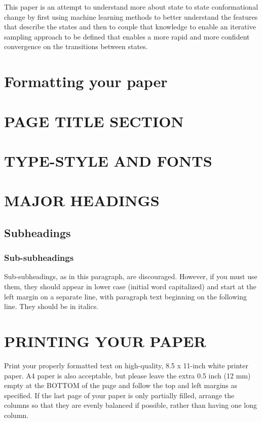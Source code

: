 \documentclass{article}
\begin{document}
This paper is an attempt to understand more about state to state conformational
change by first using machine learning methods to better understand the features
that describe the states and then to couple that knowledge to enable an iterative
sampling approach to be defined that enables a more rapid and more confident
convergence on the transitions between states.



\section{Formatting your paper}
\label{sec:format}


\section{PAGE TITLE SECTION}
\label{sec:pagestyle}


\section{TYPE-STYLE AND FONTS}
\label{sec:typestyle}


\section{MAJOR HEADINGS}
\label{sec:majhead}


\subsection{Subheadings}
\label{ssec:subhead}


\subsubsection{Sub-subheadings}
\label{sssec:subsubhead}

Sub-subheadings, as in this paragraph, are discouraged. However, if you
must use them, they should appear in lower case (initial word
capitalized) and start at the left margin on a separate line, with paragraph
text beginning on the following line.  They should be in italics.

\section{PRINTING YOUR PAPER}
\label{sec:print}

Print your properly formatted text on high-quality, 8.5 x 11-inch white printer
paper. A4 paper is also acceptable, but please leave the extra 0.5 inch (12 mm)
empty at the BOTTOM of the page and follow the top and left margins as
specified.  If the last page of your paper is only partially filled, arrange
the columns so that they are evenly balanced if possible, rather than having
one long column.
\end{document}
